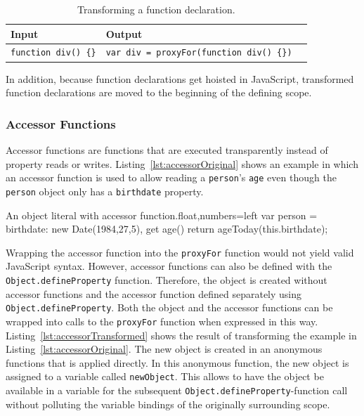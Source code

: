 \begin{table}[h]
\begin{center}
\begin{tabular}{| l | l | l |}
\hline
Input & Output \\ \hline
\lstinline|function div() {}| & \lstinline|var div = proxyFor(function div() {})| \\ \hline
\end{tabular}
\end{center}
\caption[Table caption text]{Transforming a function declaration.}
\label{table:funcTransform}
\end{table}

In addition, because function declarations get hoisted in JavaScript, transformed function declarations are moved to the beginning of the defining scope.


\subsubsection{Accessor Functions}

Accessor functions are functions that are executed transparently instead of property reads or writes.
Listing~\ref{lst:accessorOriginal} shows an example in which an accessor function is used to allow reading a \lstinline{person}'s \lstinline{age} even though the \lstinline{person} object only has a \lstinline{birthdate} property.

\begin{code}{An object literal with accessor function.}{float,numbers=left}
var person = {
    birthdate: new Date(1984,27,5),
    get age() {
        return ageToday(this.birthdate);
    }
}
\end{code}
\iffalse
\end{verbatim}\fi

Wrapping the accessor function into the \lstinline{proxyFor} function would not yield valid JavaScript syntax.
However, accessor functions can also be defined with the \lstinline{Object.defineProperty} function.
Therefore, the object is created without accessor functions and the accessor function defined separately using \lstinline{Object.defineProperty}.
Both the object and the accessor functions can be wrapped into calls to the \lstinline{proxyFor} function when expressed in this way.
Listing~\ref{lst:accessorTransformed} shows the result of transforming the example in Listing~\ref{lst:accessorOriginal}.
The new object is created in an anonymous functions that is applied directly.
In this anonymous function, the new object is assigned to a variable called \lstinline{newObject}.
This allows to have the object be available in a variable for the subsequent \lstinline{Object.defineProperty}-function call without polluting the variable bindings of the originally surrounding scope.

